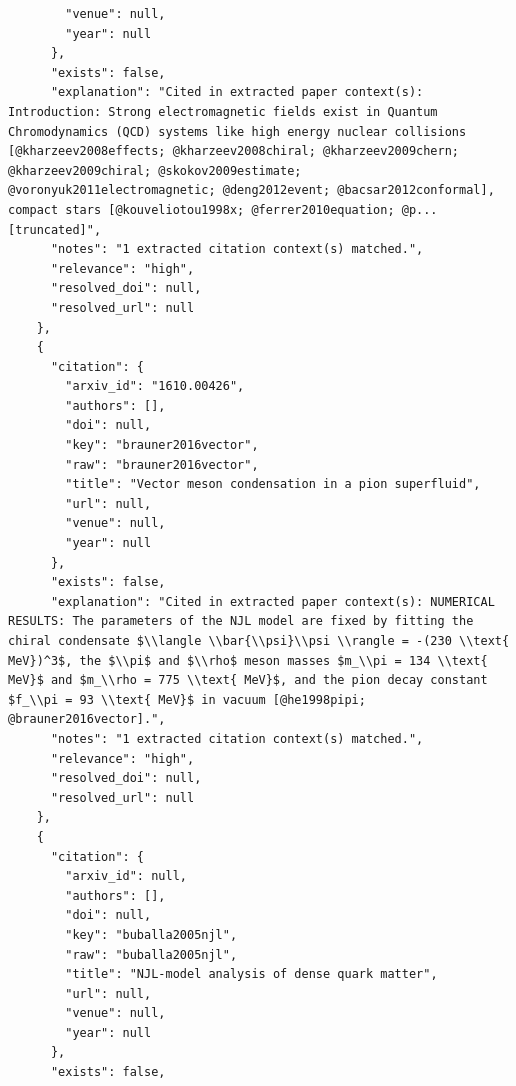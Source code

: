\documentclass[11pt]{article}
\begin{document}
\begin{verbatim}
        "venue": null,
        "year": null
      },
      "exists": false,
      "explanation": "Cited in extracted paper context(s): Introduction: Strong electromagnetic fields exist in Quantum Chromodynamics (QCD) systems like high energy nuclear collisions [@kharzeev2008effects; @kharzeev2008chiral; @kharzeev2009chern; @kharzeev2009chiral; @skokov2009estimate; @voronyuk2011electromagnetic; @deng2012event; @bacsar2012conformal], compact stars [@kouveliotou1998x; @ferrer2010equation; @p... [truncated]",
      "notes": "1 extracted citation context(s) matched.",
      "relevance": "high",
      "resolved_doi": null,
      "resolved_url": null
    },
    {
      "citation": {
        "arxiv_id": "1610.00426",
        "authors": [],
        "doi": null,
        "key": "brauner2016vector",
        "raw": "brauner2016vector",
        "title": "Vector meson condensation in a pion superfluid",
        "url": null,
        "venue": null,
        "year": null
      },
      "exists": false,
      "explanation": "Cited in extracted paper context(s): NUMERICAL RESULTS: The parameters of the NJL model are fixed by fitting the chiral condensate $\\langle \\bar{\\psi}\\psi \\rangle = -(230 \\text{ MeV})^3$, the $\\pi$ and $\\rho$ meson masses $m_\\pi = 134 \\text{ MeV}$ and $m_\\rho = 775 \\text{ MeV}$, and the pion decay constant $f_\\pi = 93 \\text{ MeV}$ in vacuum [@he1998pipi; @brauner2016vector].",
      "notes": "1 extracted citation context(s) matched.",
      "relevance": "high",
      "resolved_doi": null,
      "resolved_url": null
    },
    {
      "citation": {
        "arxiv_id": null,
        "authors": [],
        "doi": null,
        "key": "buballa2005njl",
        "raw": "buballa2005njl",
        "title": "NJL-model analysis of dense quark matter",
        "url": null,
        "venue": null,
        "year": null
      },
      "exists": false,

\end{verbatim}
\end{document}
